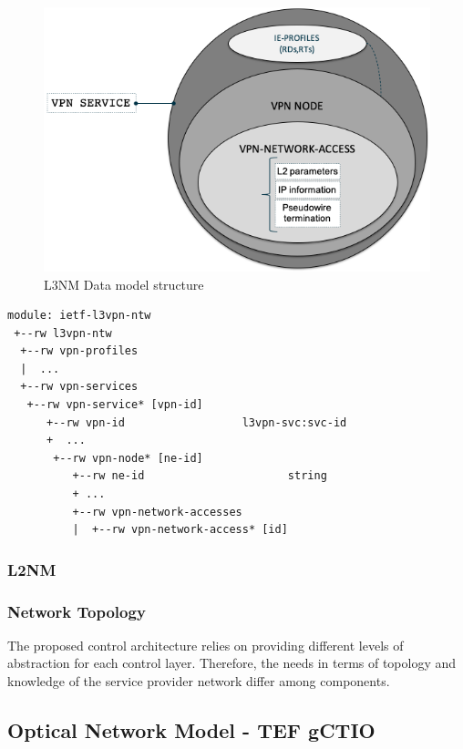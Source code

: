 \documentclass[a4paper,fleqn]{cas-dc}
\begin{document}
\begin{figure}
	\centering
		\includegraphics[scale=0.35]{figs/L3NM.png}
	\caption{L3NM Data model structure}
	\label{FIG:l3nm}
\end{figure}

\begin{lstlisting}[basicstyle=\ttfamily\small,label=l3nm,caption=L3NM Yang Structure]
module: ietf-l3vpn-ntw
 +--rw l3vpn-ntw
  +--rw vpn-profiles
  |  ...
  +--rw vpn-services
   +--rw vpn-service* [vpn-id]
      +--rw vpn-id                  l3vpn-svc:svc-id
      +  ...
       +--rw vpn-node* [ne-id]
          +--rw ne-id                      string
          + ...
          +--rw vpn-network-accesses
          |  +--rw vpn-network-access* [id]
\end{lstlisting}

\subsubsection{L2NM}

\subsubsection{Network Topology}

The proposed control architecture relies on providing different levels of abstraction for each control layer. Therefore, the needs in terms of topology and knowledge of the service provider network differ among components.

\subsection{Optical Network Model - TEF gCTIO}
\end{document}
